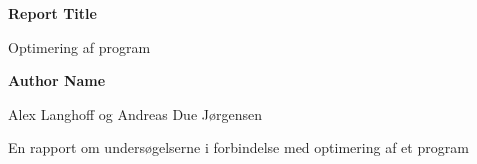 \begin{titlepage}
\begin{center}
\vspace*{1cm}

\textbf{Report Title}

\vspace{0.5cm}
 Optimering af program
            
\vspace{1.5cm}

\textbf{Author Name}

\vspace{0.5cm}
Alex Langhoff og Andreas Due Jørgensen

	
       \vfill
            
En rapport om undersøgelserne i forbindelse med optimering af et program\\
       \vspace{0.8cm}
   \end{center}
\end{titlepage}
